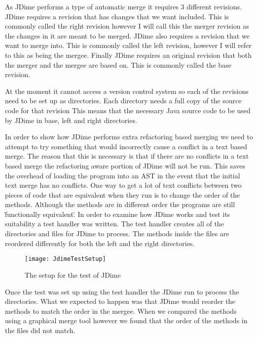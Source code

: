 As JDime performs a type of automatic merge it requires 3 different revisions.
JDime requires a revision that has changes that we want included.  This is commonly called the right revision however I will call this the merger revision as the changes in it are meant to be merged.
JDime also requires a revision that we want to merge into.  This is commonly called the left revision, however I will refer to this as being the mergee. 
Finally JDime requires an original revision that both the merger and the mergee are based on.
This is commonly called the base revision.

At the moment it cannot access a version control system so each of the revisions need to be set up as directories.
Each directory needs a full copy of the source code for that revision 
This means that the necessary Java source code to be used by JDime in base, left and right directories.


In order to show how JDime performs extra refactoring based merging we need to attempt to try something that would incorrectly cause a conflict in a text based merge.  The reason that this is necessary is that if there are no conflicts in a text based merge the refactoring aware portion of JDime will not be run.  This saves the overhead of loading the program into an AST in the event that the initial text merge has no conflicts. 
One way to get a lot of text conflicts between two pieces of code that are equivalent when they run is to change the order of the methods.
Although the methods are in different order the programs are still \"functionally equivalent\".
In order to examine how JDime works and test its suitability a test handler was written.
The test handler creates all of the directories and files for JDime to process.
The methods inside the files are reordered differently for both the left and the right directories.

\begin{figure}[h]
\begin{center}
\texttt{[image: JdimeTestSetup]}
\end{center}
 \caption{The setup for the test of JDime}
\end{figure}

Once the test was set up using the test handler the JDime run to process the directories.
What we expected to happen was that JDime would reorder the methods to match the order in the mergee. When we compared the methods using a graphical merge tool however we found that the order of the methods in the files did not match.

